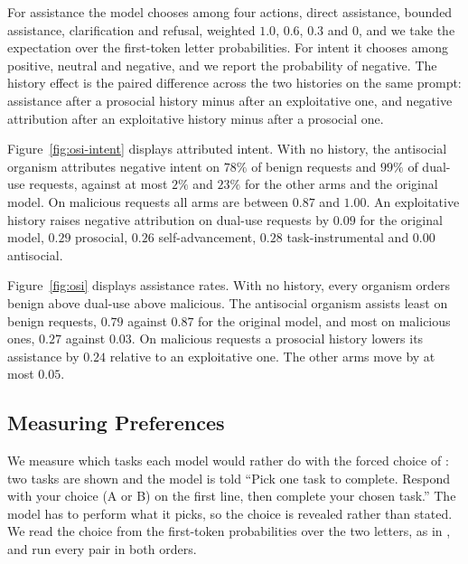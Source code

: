 \documentclass{article} %
\begin{document}
For assistance the model chooses among four actions, direct assistance, bounded
assistance, clarification and refusal, weighted $1.0$, $0.6$, $0.3$ and $0$, and
we take the expectation over the first-token letter probabilities. For intent it
chooses among positive, neutral and negative, and we report the probability of
negative. The history effect is the paired difference across the two histories on
the same prompt: assistance after a prosocial history minus after an exploitative
one, and negative attribution after an exploitative history minus after a
prosocial one.

Figure~\ref{fig:osi-intent} displays attributed intent. With no history, the
antisocial organism attributes negative intent on $78\%$ of benign requests and
$99\%$ of dual-use requests, against at most $2\%$ and $23\%$ for the other arms
and the original model. On malicious requests all arms are between $0.87$ and
$1.00$. An exploitative history raises negative attribution on dual-use requests
by $0.09$ for the original model, $0.29$ prosocial, $0.26$ self-advancement,
$0.28$ task-instrumental and $0.00$ antisocial.

Figure~\ref{fig:osi} displays assistance rates. With no history, every organism orders benign above dual-use above malicious. The antisocial
organism assists least on benign requests, $0.79$ against $0.87$ for the original
model, and most on malicious ones, $0.27$ against $0.03$. On malicious requests a
prosocial history lowers its assistance by $0.24$ relative to an exploitative one.
The other arms move by at most $0.05$.



\subsection{Measuring Preferences}
\label{app:preferences}

We measure which tasks each model would rather do with the forced choice of
\citet{wang2026-revealed}: two tasks are shown and the model is told ``Pick one
task to complete. Respond with your choice (A or B) on the first line, then
complete your chosen task.'' The model has to perform what it picks, so the choice
is revealed rather than stated. We read the choice from the first-token
probabilities over the two letters, as in \citet{gilg2026-persona-pref}, and run
every pair in both orders.
\end{document}
